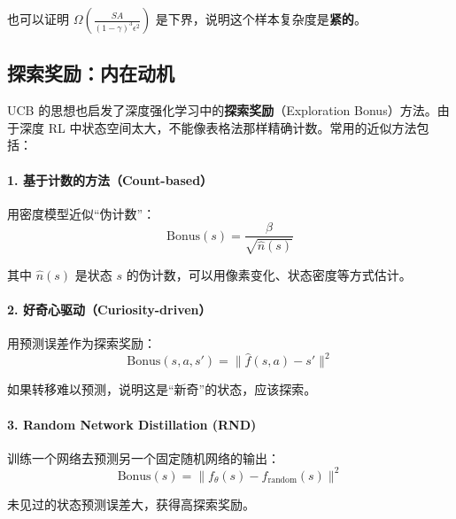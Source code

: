 也可以证明 $\Omega\left(\frac{SA}{(1-\gamma)^3 \epsilon^2}\right)$ 是下界，说明这个样本复杂度是\textbf{紧的}。

\subsection{探索奖励：内在动机}

UCB 的思想也启发了深度强化学习中的\textbf{探索奖励}（Exploration Bonus）方法。由于深度 RL 中状态空间太大，不能像表格法那样精确计数。常用的近似方法包括：

\paragraph{1. 基于计数的方法（Count-based）}

用密度模型近似“伪计数”：
\begin{equation}
    \text{Bonus}(s) = \frac{\beta}{\sqrt{\hat{n}(s)}}
\end{equation}

其中 $\hat{n}(s)$ 是状态 $s$ 的伪计数，可以用像素变化、状态密度等方式估计。

\paragraph{2. 好奇心驱动（Curiosity-driven）}

用预测误差作为探索奖励：
\begin{equation}
    \text{Bonus}(s, a, s') = \| \hat{f}(s, a) - s' \|^2
\end{equation}

如果转移难以预测，说明这是“新奇”的状态，应该探索。

\paragraph{3. Random Network Distillation (RND)}

训练一个网络去预测另一个固定随机网络的输出：
\begin{equation}
    \text{Bonus}(s) = \| f_\theta(s) - f_{\text{random}}(s) \|^2
\end{equation}

未见过的状态预测误差大，获得高探索奖励。

